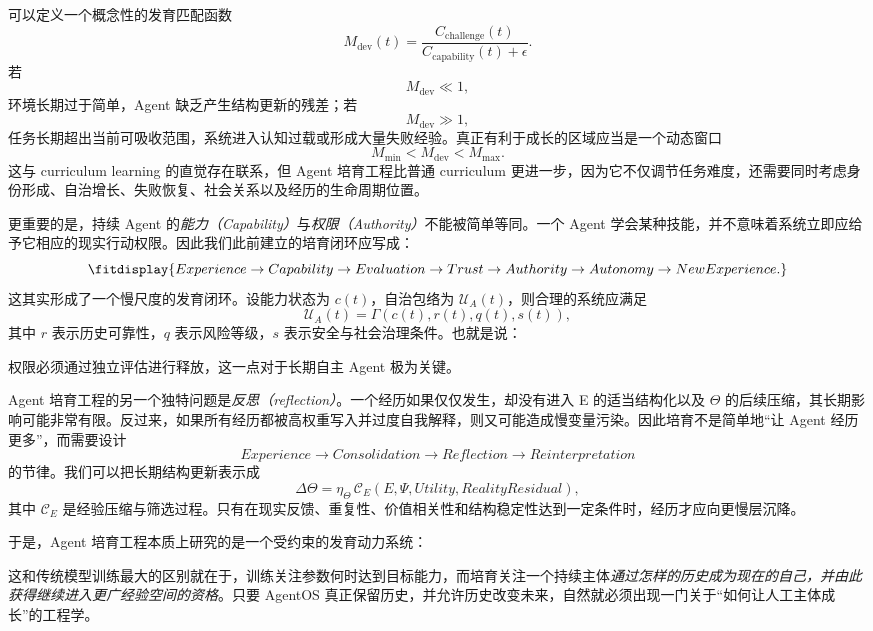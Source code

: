 可以定义一个概念性的发育匹配函数
\[
M_{\mathrm{dev}}(t)
=
\frac{
C_{\mathrm{challenge}}(t)
}{
C_{\mathrm{capability}}(t)+\epsilon
}.
\]
若
\[
M_{\mathrm{dev}}\ll 1,
\]
环境长期过于简单，Agent 缺乏产生结构更新的残差；若
\[
M_{\mathrm{dev}}\gg 1,
\]
任务长期超出当前可吸收范围，系统进入认知过载或形成大量失败经验。真正有利于成长的区域应当是一个动态窗口
\[
M_{\min}
<
M_{\mathrm{dev}}
<
M_{\max}.
\]
这与 curriculum learning 的直觉存在联系，但 Agent 培育工程比普通 curriculum 更进一步，因为它不仅调节任务难度，还需要同时考虑身份形成、自治增长、失败恢复、社会关系以及经历的生命周期位置。

更重要的是，持续 Agent 的\emph{能力（Capability）}与\emph{权限（Authority）}不能被简单等同。一个 Agent 学会某种技能，并不意味着系统立即应给予它相应的现实行动权限。因此我们此前建立的培育闭环应写成：
\[
\fitdisplay{
Experience
\rightarrow
Capability
\rightarrow
Evaluation
\rightarrow
Trust
\rightarrow
Authority
\rightarrow
Autonomy
\rightarrow
NewExperience.
}
\]
这其实形成了一个慢尺度的发育闭环。设能力状态为 $c(t)$，自治包络为 $\mathcal U_A(t)$，则合理的系统应满足
\[
\mathcal U_A(t)
=
\Gamma
\left(
c(t),
r(t),
q(t),
s(t)
\right),
\]
其中 $r$ 表示历史可靠性，$q$ 表示风险等级，$s$ 表示安全与社会治理条件。也就是说：
\begin{statementbox}
\centering
{}
\end{statementbox}
权限必须通过独立评估进行释放，这一点对于长期自主 Agent 极为关键。

Agent 培育工程的另一个独特问题是\emph{反思（reflection）}。一个经历如果仅仅发生，却没有进入 E 的适当结构化以及 $\Theta$ 的后续压缩，其长期影响可能非常有限。反过来，如果所有经历都被高权重写入并过度自我解释，则又可能造成慢变量污染。因此培育不是简单地“让 Agent 经历更多”，而需要设计
\[
Experience
\rightarrow
Consolidation
\rightarrow
Reflection
\rightarrow
Reinterpretation
\]
的节律。我们可以把长期结构更新表示成
\[
\Delta\Theta
=
\eta_{\Theta}
\,
\mathcal C_E
\left(
E,
\Psi,
Utility,
RealityResidual
\right),
\]
其中 $\mathcal C_E$ 是经验压缩与筛选过程。只有在现实反馈、重复性、价值相关性和结构稳定性达到一定条件时，经历才应向更慢层沉降。

于是，Agent 培育工程本质上研究的是一个受约束的发育动力系统：
\begin{statementbox}
\centering
{}
\end{statementbox}
这和传统模型训练最大的区别就在于，训练关注参数何时达到目标能力，而培育关注一个持续主体\emph{通过怎样的历史成为现在的自己，并由此获得继续进入更广经验空间的资格}。只要 AgentOS 真正保留历史，并允许历史改变未来，自然就必须出现一门关于“如何让人工主体成长”的工程学。

